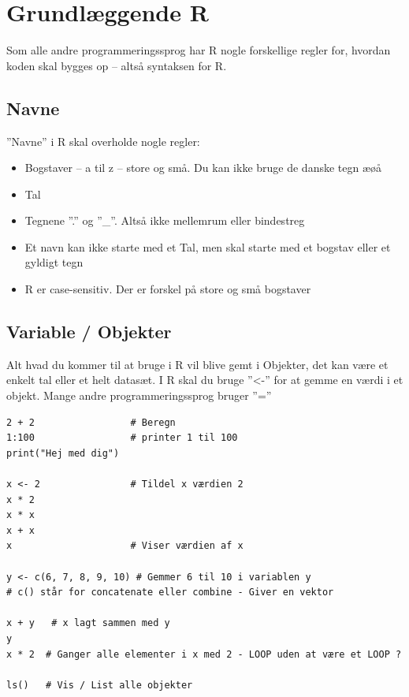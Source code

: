 \documentclass[
]{book}
\providecommand{\tightlist}{%
  \setlength{\itemsep}{0pt}\setlength{\parskip}{0pt}}
\begin{document}
\hypertarget{grund}{%
\chapter{Grundlæggende R}\label{grund}}

Som alle andre programmeringssprog har R nogle forskellige regler for, hvordan koden skal bygges op -- altså syntaksen for R.

\hypertarget{navne}{%
\section{Navne}\label{navne}}

''Navne'' i R skal overholde nogle regler:

\begin{itemize}
\tightlist
\item
  Bogstaver -- a til z -- store og små. Du kan ikke bruge de danske tegn æøå
\item
  Tal
\item
  Tegnene ''.'' og ''\_''. Altså ikke mellemrum eller bindestreg
\item
  Et navn kan ikke starte med et Tal, men skal starte med et bogstav eller et gyldigt tegn
\item
  R er case-sensitiv. Der er forskel på store og små bogstaver
\end{itemize}

\hypertarget{variable-objekter}{%
\section{Variable / Objekter}\label{variable-objekter}}

Alt hvad du kommer til at bruge i R vil blive gemt i Objekter, det kan være et enkelt tal eller et helt datasæt.
I R skal du bruge ''\textless-'' for at gemme en værdi i et objekt. Mange andre programmeringssprog bruger ''=''

\begin{verbatim}
2 + 2                 # Beregn
1:100                 # printer 1 til 100
print("Hej med dig")

x <- 2                # Tildel x værdien 2
x * 2
x * x
x + x
x                     # Viser værdien af x

y <- c(6, 7, 8, 9, 10) # Gemmer 6 til 10 i variablen y
# c() står for concatenate eller combine - Giver en vektor

x + y   # x lagt sammen med y
y
x * 2  # Ganger alle elementer i x med 2 - LOOP uden at være et LOOP ?

ls()   # Vis / List alle objekter
\end{verbatim}
\end{document}

